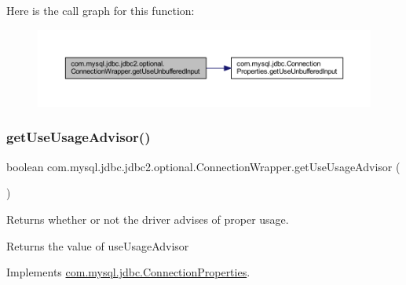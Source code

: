Here is the call graph for this function\+:
\nopagebreak
\begin{figure}[H]
\begin{center}
\leavevmode
\includegraphics[width=350pt]{classcom_1_1mysql_1_1jdbc_1_1jdbc2_1_1optional_1_1_connection_wrapper_a3c1db049eb316025a36115fbc35b225f_cgraph}
\end{center}
\end{figure}
\mbox{\label{classcom_1_1mysql_1_1jdbc_1_1jdbc2_1_1optional_1_1_connection_wrapper_a7d80daca8afe93680ae9cff38bd9e287}} 
\subsubsection{\texorpdfstring{get\+Use\+Usage\+Advisor()}{getUseUsageAdvisor()}}
{\footnotesize\ttfamily boolean com.\+mysql.\+jdbc.\+jdbc2.\+optional.\+Connection\+Wrapper.\+get\+Use\+Usage\+Advisor (\begin{DoxyParamCaption}{ }\end{DoxyParamCaption})}

Returns whether or not the driver advises of proper usage.

\begin{DoxyReturn}{Returns}
the value of use\+Usage\+Advisor 
\end{DoxyReturn}


Implements \mbox{\hyperlink{interfacecom_1_1mysql_1_1jdbc_1_1_connection_properties_ac3d940436d5babe33067c3f75817e9a9}{com.\+mysql.\+jdbc.\+Connection\+Properties}}.

